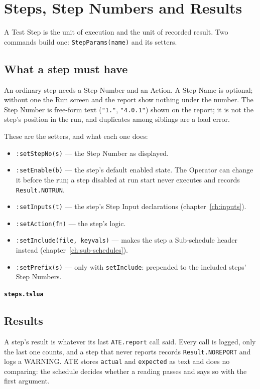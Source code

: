 \chapter{Steps, Step Numbers and Results}\label{ch:steps}

A Test Step is the unit of execution and the unit of recorded result. Two commands build one:
\texttt{StepParams(name)} and its setters.

\section{What a step must have}

An ordinary step needs a Step Number and an Action. A Step Name is optional; without one the
Run screen and the report show nothing under the number. The Step Number is free-form text
(\texttt{"1."}, \texttt{"4.0.1"}) shown on the report; it is not the step's position in the
run, and duplicates among siblings are a load error.

These are the setters, and what each one does:

\begin{itemize}
  \item \texttt{:setStepNo(s)} --- the Step Number as displayed.
  \item \texttt{:setEnable(b)} --- the step's default enabled state. The Operator can change
    it before the run; a step disabled at run start never executes and records
    \texttt{Result.NOTRUN}.
  \item \texttt{:setInputs(t)} --- the step's Step Input declarations (chapter~\ref{ch:inputs}).
  \item \texttt{:setAction(fn)} --- the step's logic.
  \item \texttt{:setInclude(file, keyvals)} --- makes the step a Sub-schedule header instead
    (chapter~\ref{ch:sub-schedules}).
  \item \texttt{:setPrefix(s)} --- only with \texttt{setInclude}: prepended to the included
    steps' Step Numbers.
\end{itemize}

\noindent\textbf{\texttt{steps.tslua}}\par


\section{Results}

A step's result is whatever its last \texttt{ATE.report} call said. Every call is logged, only
the last one counts, and a step that never reports records \texttt{Result.NOREPORT} and logs a
WARNING. ATE stores \texttt{actual} and \texttt{expected} as text and does no comparing: the
schedule decides whether a reading passes and says so with the first argument.

